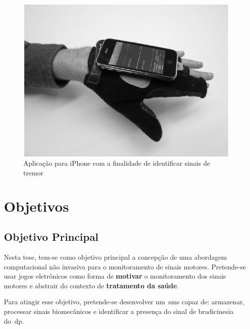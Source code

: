 
\begin{figure}
 \centering
 \includegraphics[scale=0.3]{./img/moyne-iphone.png}
\caption[Aplicação para \textit{smartphone} com a finalidade de identificar sinais de tremor]{Aplicação para iPhone com a finalidade de identificar sinais de tremor ~\cite{lemoyne2010}}
 \label{fig:iphone-tremor}
\end{figure}


\section{Objetivos}
\subsection{Objetivo Principal}
Nesta tese, tem-se como objetivo principal a concepção de uma abordagem computacional não invasiva para o monitoramento de sinais motores. Pretende-se usar jogos eletrônicos como forma de \textbf{motivar} o monitoramento dos sinais motores e abstrair do contexto de \textbf{tratamento da saúde}.

Para atingir esse objetivo, pretende-se desenvolver um~\ac{sms} capaz de: armazenar, processar sinais biomecânicos e identificar a presença do sinal de bradicinesia do~\ac{dp}. 


